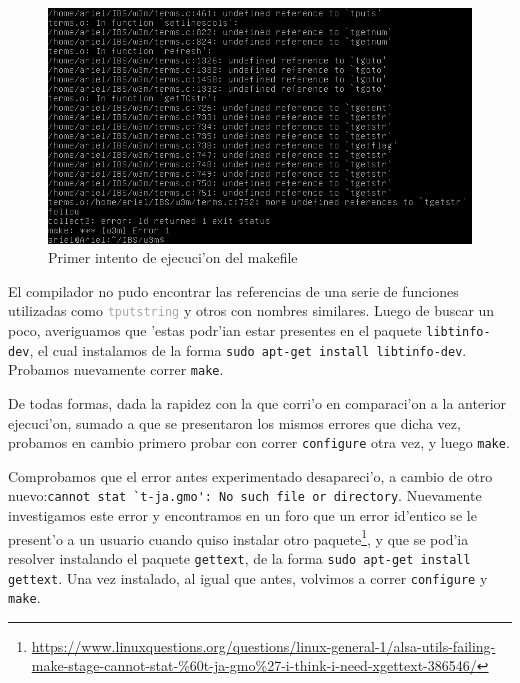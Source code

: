 \documentclass[11pt]{article}
\begin{document}
		\begin{figure}[H]
			\centering \captionsetup{justification=centering}
			\includegraphics[width=.8\linewidth]{Images/Compile_w3m/libtinfo-dev_missing}
			\caption{Primer intento de ejecuci'on del makefile}
			\label{fig:libtinfo-dev_missing}
		\end{figure}
		
		El compilador no pudo encontrar las referencias de una serie de funciones utilizadas como \texttt{\textcolor{darkgray}{tputstring}} y otros con nombres similares. Luego de buscar un poco, averiguamos que 'estas podr'ian estar presentes en el paquete \texttt{libtinfo-dev}, el cual instalamos de la forma \texttt{sudo apt-get install libtinfo-dev}. Probamos nuevamente correr \texttt{make}.
		
		De todas formas, dada la rapidez con la que corri'o en comparaci'on a la anterior ejecuci'on, sumado a que se presentaron los mismos errores que dicha vez, probamos en cambio primero probar con correr \texttt{configure} otra vez, y luego \texttt{make}.
		
		
		Comprobamos que el error antes experimentado desapareci'o, a cambio de otro nuevo:\enspace\verb|cannot stat `t-ja.gmo': No such file or directory|. Nuevamente investigamos este error y encontramos en un foro que un error id'entico se le present'o a un usuario cuando quiso instalar otro paquete\footnote{ \url{https://www.linuxquestions.org/questions/linux-general-1/alsa-utils-failing-make-stage-cannot-stat-\%60t-ja-gmo\%27-i-think-i-need-xgettext-386546/}}, y que se pod'ia resolver instalando el paquete \texttt{gettext}, de la forma \texttt{sudo apt-get install gettext}. Una vez instalado, al igual que antes, volvimos a correr \texttt{configure} y \texttt{make}.
		
\end{document}
